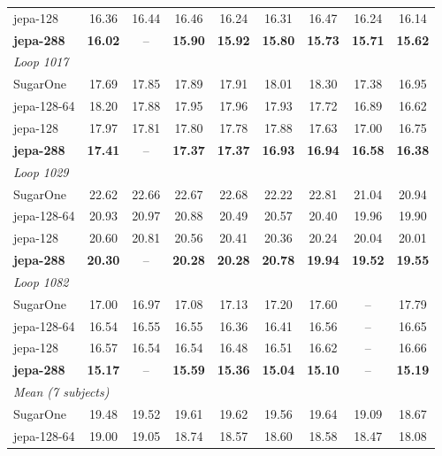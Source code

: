 \begin{table}[ht]
\begin{tabular}{lcccccccc}
        jepa-128 & 16.36 & 16.44 & 16.46 & 16.24 & 16.31 & 16.47 & 16.24 & 16.14 \\
        \textbf{jepa-288} & \textbf{16.02} & -- & \textbf{15.90} & \textbf{15.92} & \textbf{15.80} & \textbf{15.73} & \textbf{15.71} & \textbf{15.62} \\
        \hline
        \multicolumn{9}{l}{\textit{Loop 1017}} \\
        SugarOne & 17.69 & 17.85 & 17.89 & 17.91 & 18.01 & 18.30 & 17.38 & 16.95 \\
        jepa-128-64 & 18.20 & 17.88 & 17.95 & 17.96 & 17.93 & 17.72 & 16.89 & 16.62 \\
        jepa-128 & 17.97 & 17.81 & 17.80 & 17.78 & 17.88 & 17.63 & 17.00 & 16.75 \\
        \textbf{jepa-288} & \textbf{17.41} & -- & \textbf{17.37} & \textbf{17.37} & \textbf{16.93} & \textbf{16.94} & \textbf{16.58} & \textbf{16.38} \\
        \hline
        \multicolumn{9}{l}{\textit{Loop 1029}} \\
        SugarOne & 22.62 & 22.66 & 22.67 & 22.68 & 22.22 & 22.81 & 21.04 & 20.94 \\
        jepa-128-64 & 20.93 & 20.97 & 20.88 & 20.49 & 20.57 & 20.40 & 19.96 & 19.90 \\
        jepa-128 & 20.60 & 20.81 & 20.56 & 20.41 & 20.36 & 20.24 & 20.04 & 20.01 \\
        \textbf{jepa-288} & \textbf{20.30} & -- & \textbf{20.28} & \textbf{20.28} & \textbf{20.78} & \textbf{19.94} & \textbf{19.52} & \textbf{19.55} \\
        \hline
        \multicolumn{9}{l}{\textit{Loop 1082}} \\
        SugarOne & 17.00 & 16.97 & 17.08 & 17.13 & 17.20 & 17.60 & -- & 17.79 \\
        jepa-128-64 & 16.54 & 16.55 & 16.55 & 16.36 & 16.41 & 16.56 & -- & 16.65 \\
        jepa-128 & 16.57 & 16.54 & 16.54 & 16.48 & 16.51 & 16.62 & -- & 16.66 \\
        \textbf{jepa-288} & \textbf{15.17} & -- & \textbf{15.59} & \textbf{15.36} & \textbf{15.04} & \textbf{15.10} & -- & \textbf{15.19} \\
        \hline
        \multicolumn{9}{l}{\textit{Mean (7 subjects)}} \\
        SugarOne & 19.48 & 19.52 & 19.61 & 19.62 & 19.56 & 19.64 & 19.09 & 18.67 \\
        jepa-128-64 & 19.00 & 19.05 & 18.74 & 18.57 & 18.60 & 18.58 & 18.47 & 18.08 \\

\end{tabular}
\end{table}
